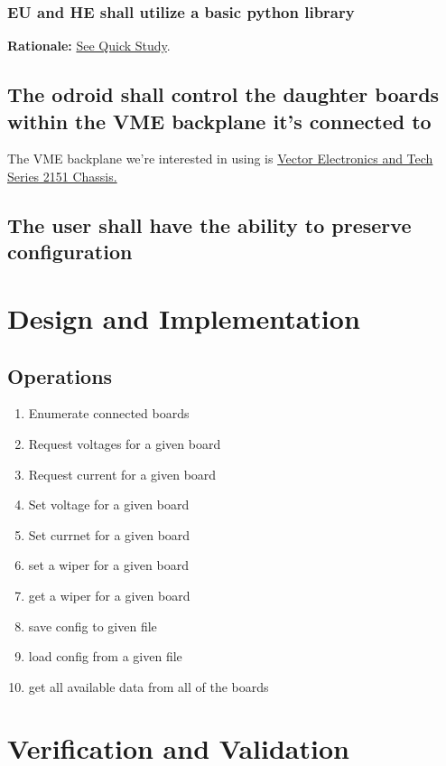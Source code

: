 \documentclass[11pt,letterpaper]{article}
\begin{document}
\subsubsection{EU and HE shall utilize a basic python library}
\textbf{Rationale:} \hyperref[sec:undefined_ui_req]{See Quick Study}.

\subsection{The odroid shall control the daughter boards within the VME backplane it's connected to}
The VME backplane we're interested in using is \href{https://www.vectorelect.com/series-2151.html}{Vector Electronics and Tech Series 2151 Chassis.}
\subsection{The user shall have the ability to preserve configuration}
%
%
%
\newpage
\section{Design and Implementation}

\subsection{Operations}
\begin{enumerate}
    \item Enumerate connected boards
    \item Request voltages for a given board
    \item Request current for a given board
    \item Set voltage for a given board
    \item Set currnet for a given board
    \item set a wiper for a given board
    \item get a wiper for a given board
    \item save config to given file
    \item load config from a given file
    \item get all available data from all of the boards
\end{enumerate}

\newpage
\section{Verification and Validation}
\end{document}
